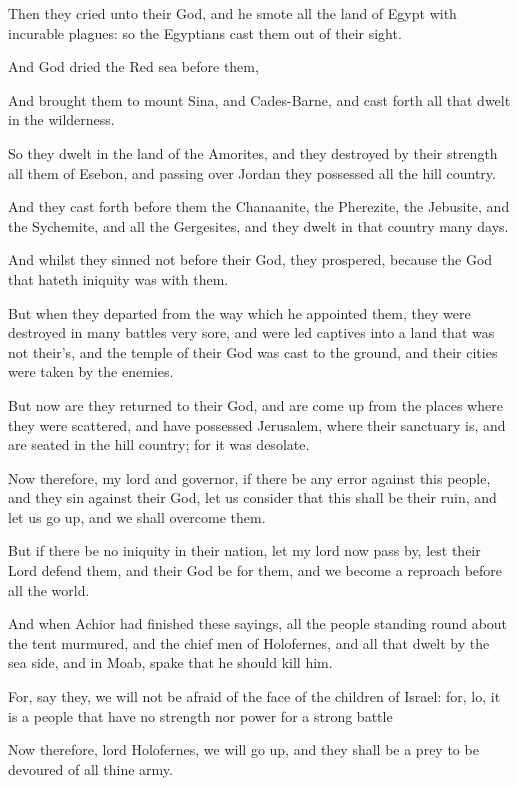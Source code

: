{\par }{\PP {}Then they cried unto their God, and he smote all the land of Egypt with incurable plagues: so the Egyptians cast them out of their sight.
\par }{\PP {}And God dried the Red sea before them,
\par }{\PP {}And brought them to mount Sina, and Cades-Barne, and cast forth all that dwelt in the wilderness.
\par }{\PP {}So they dwelt in the land of the Amorites, and they destroyed by their strength all them of Esebon, and passing over Jordan they possessed all the hill country.
\par }{\PP {}And they cast forth before them the Chanaanite, the Pherezite, the Jebusite, and the Sychemite, and all the Gergesites, and they dwelt in that country many days.
\par }{\PP {}And whilst they sinned not before their God, they prospered, because the God that hateth iniquity was with them.
\par }{\PP {}But when they departed from the way which he appointed them, they were destroyed in many battles very sore, and were led captives into a land that was not their’s, and the temple of their God was cast to the ground, and their cities were taken by the enemies.
\par }{\PP {}But now are they returned to their God, and are come up from the places where they were scattered, and have possessed Jerusalem, where their sanctuary is, and are seated in the hill country; for it was desolate.
\par }{\PP {}Now therefore, my lord and governor, if there be any error against this people, and they sin against their God, let us consider that this shall be their ruin, and let us go up, and we shall overcome them.
\par }{\PP {}But if there be no iniquity in their nation, let my lord now pass by, lest their Lord defend them, and their God be for them, and we become a reproach before all the world.
\par }{\PP {}And when Achior had finished these sayings, all the people standing round about the tent murmured, and the chief men of Holofernes, and all that dwelt by the sea side, and in Moab, spake that he should kill him.
\par }{\PP {}For, say they, we will not be afraid of the face of the children of Israel: for, lo, it is a people that have no strength nor power for a strong battle
\par }{\PP {}Now therefore, lord Holofernes, we will go up, and they shall be a prey to be devoured of all thine army.

}
